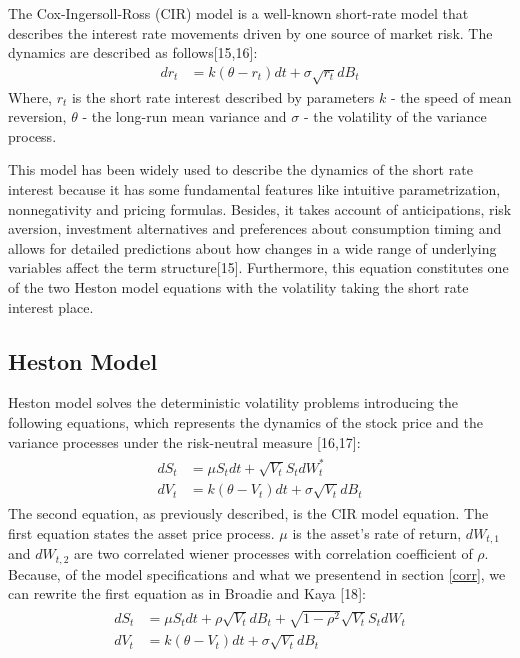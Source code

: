 \documentclass[12pt,twoside]{reedthesis}
\theoremstyle{definition}
\theoremstyle{definition}
\theoremstyle{remark}
\begin{document}
  The Cox-Ingersoll-Ross (CIR) model is a well-known short-rate model that
  describes the interest rate movements driven by one source of market
  risk. The dynamics are described as follows{[}15,16{]}:
  \begin{align}
  \label{eq:cir}
  dr_t &= k(\theta - r_t)dt + \sigma \sqrt{r_t} dB_t
  \end{align}
  \noindent
  Where, \(r_t\) is the short rate interest described by parameters \(k\)
  - the speed of mean reversion, \(\theta\) - the long-run mean variance
  and \(\sigma\) - the volatility of the variance process.
  
  This model has been widely used to describe the dynamics of the short
  rate interest because it has some fundamental features like intuitive
  parametrization, nonnegativity and pricing formulas. Besides, it takes
  account of anticipations, risk aversion, investment alternatives and
  preferences about consumption timing and allows for detailed predictions
  about how changes in a wide range of underlying variables affect the
  term structure{[}15{]}. Furthermore, this equation constitutes one of
  the two Heston model equations with the volatility taking the short rate
  interest place.
  
  \subsection{Heston Model}\label{heston-model}
  
  Heston model solves the deterministic volatility problems introducing
  the following equations, which represents the dynamics of the stock
  price and the variance processes under the risk-neutral measure
  {[}16,17{]}:
  \begin{align}
  \label{eq:heston}
  \begin{split}
  dS_t &= \mu S_t dt + \sqrt{V_t} S_t dW^*_t \\
  dV_t &= k(\theta - V_t)dt + \sigma \sqrt{V_t} dB_t
  \end{split}
  \end{align}
  The second equation, as previously described, is the CIR model equation.
  The first equation states the asset price process. \(\mu\) is the
  asset's rate of return, \(dW_{t,1}\) and \(dW_{t,2}\) are two correlated
  wiener processes with correlation coefficient of \(\rho\). Because, of
  the model specifications and what we presentend in section \ref{corr},
  we can rewrite the first equation as in Broadie and Kaya {[}18{]}:
  \begin{align}
  \label{eq:heston2}
  \begin{split}
  dS_t &= \mu S_t dt + \rho \sqrt{V_t} dB_t + \sqrt{1 - \rho^2} \sqrt{V_t} S_t dW_t \\
  dV_t &= k(\theta - V_t)dt + \sigma \sqrt{V_t} dB_t
  \end{split}
  \end{align}
\end{document}
